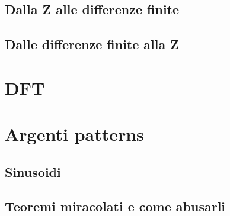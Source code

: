 \documentclass[11pt]{article}
\begin{document}
\subsection{Dalla Z alle differenze finite}
\label{sec:org59f15ea}
\subsection{Dalle differenze finite alla Z}
\label{sec:org0975d25}

\section{DFT}
\label{sec:org43f1a82}


\section{Argenti patterns}
\label{sec:org08e854b}
\subsection{Sinusoidi}
\label{sec:orge09878a}
\subsection{Teoremi miracolati e come abusarli}
\label{sec:org8c2a1c0}
\end{document}
